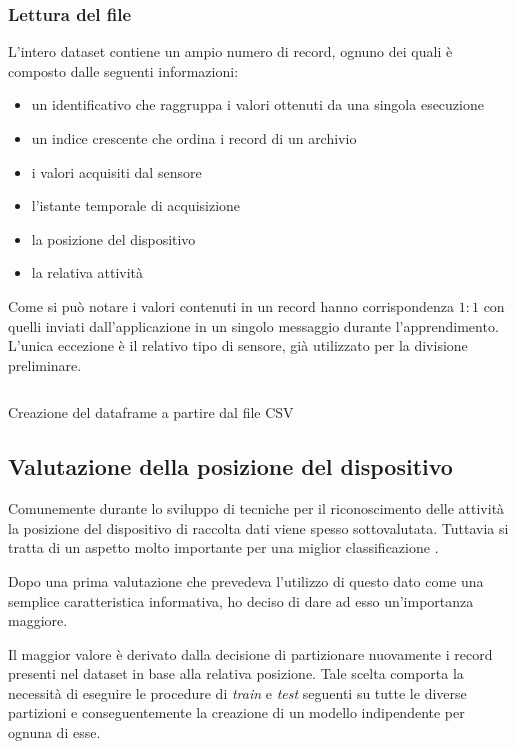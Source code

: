 \subsubsection{Lettura del file}
L'intero dataset contiene un ampio numero di record, ognuno dei quali è composto dalle seguenti informazioni:
\begin{itemize}
    \item un identificativo che raggruppa i valori ottenuti da una singola esecuzione
    \item un indice crescente che ordina i record di un archivio
    \item i valori acquisiti dal sensore
    \item l'istante temporale di acquisizione
    \item la posizione del dispositivo
    \item la relativa attività
\end{itemize}
Come si può notare i valori contenuti in un record hanno corrispondenza $1:1$ con quelli 
inviati dall'applicazione in un singolo messaggio durante l'apprendimento. L'unica eccezione è 
il relativo tipo di sensore, già utilizzato per la divisione preliminare.

\begin{listing}[H] 
    \inputminted[frame=single,framesep=10pt]{python}{assets/snippets/classifier/read_csv.py}
    \caption{Creazione del dataframe a partire dal file CSV}
\end{listing}


\subsection{Valutazione della posizione del dispositivo}
Comunemente durante lo sviluppo di tecniche per il riconoscimento delle attività la posizione del dispositivo di 
raccolta dati viene spesso sottovalutata. Tuttavia si tratta di un aspetto molto importante per 
una miglior classificazione \cite{umafall}.

\vspace{5mm} %

Dopo una prima valutazione che prevedeva l'utilizzo di questo dato come una semplice caratteristica informativa, ho deciso 
di dare ad esso un'importanza maggiore. 

Il maggior valore è derivato dalla decisione di partizionare nuovamente i record presenti nel dataset in base alla relativa posizione. 
Tale scelta comporta la necessità di eseguire le procedure di \textit{train} e \textit{test} seguenti su tutte 
le diverse partizioni e conseguentemente la creazione di un modello indipendente per ognuna di esse.

